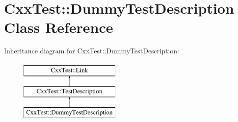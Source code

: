 \hypertarget{classCxxTest_1_1DummyTestDescription}{\section{Cxx\-Test\-:\-:Dummy\-Test\-Description Class Reference}
\label{classCxxTest_1_1DummyTestDescription}
}
Inheritance diagram for Cxx\-Test\-:\-:Dummy\-Test\-Description\-:\begin{figure}[H]
\begin{center}
\leavevmode
\includegraphics[height=3.000000cm]{classCxxTest_1_1DummyTestDescription}
\end{center}
\end{figure}
